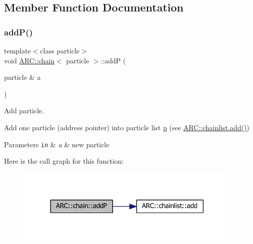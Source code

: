 \subsection{Member Function Documentation}
\hypertarget{classARC_1_1chain_a0f91c399beb1e5c0db6ed7e2b4d00477}{}\label{classARC_1_1chain_a0f91c399beb1e5c0db6ed7e2b4d00477} 
\subsubsection{\texorpdfstring{add\+P()}{addP()}\hspace{0.1cm}{\footnotesize\ttfamily [1/3]}}
{\footnotesize\ttfamily template$<$class particle$>$ \\
void \hyperlink{classARC_1_1chain}{A\+R\+C\+::chain}$<$ particle $>$\+::addP (\begin{DoxyParamCaption}\item[{particle \&}]{a }\end{DoxyParamCaption})\hspace{0.3cm}{\ttfamily [inline]}}



Add particle. 

Add one particle (address pointer) into particle list \hyperlink{classARC_1_1chain_af1793b656e139e1f87c2e0a55f87514b}{p} (see \hyperlink{classARC_1_1chainlist_afa780edfa301cc22cf189e63d7a59c2c}{A\+R\+C\+::chainlist.\+add()}) 
\begin{DoxyParams}[1]{Parameters}
\mbox{\tt in}  & {\em a} & new particle \\
\hline
\end{DoxyParams}
Here is the call graph for this function\+:
\nopagebreak
\begin{figure}[H]
\begin{center}
\leavevmode
\includegraphics[width=309pt]{classARC_1_1chain_a0f91c399beb1e5c0db6ed7e2b4d00477_cgraph}
\end{center}
\end{figure}
\hypertarget{classARC_1_1chain_a22a0c3e8b42954edee0d2f66a27e8640}{}\label{classARC_1_1chain_a22a0c3e8b42954edee0d2f66a27e8640} 
